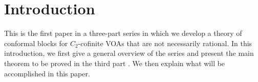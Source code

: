 \documentclass[11pt,b5paper,notitlepage]{article}
\theoremstyle{definition}
\theoremstyle{plain}
\newcommand{\<}{\left\langle}
\renewcommand{\>}{\right\rangle}
\numberwithin{equation}{section}
\begin{document}
\tableofcontents




	
	
	
	

	
	

	
	
	
	
	
	
	
	
	

	




\section{Introduction}


\nocite{HLZ1,HLZ2,HLZ3,HLZ4,HLZ5,HLZ6,HLZ7,HLZ8}
This is the first paper in a three-part series in which we develop a theory of conformal blocks for $C_2$-cofinite VOAs that are not necessarily rational. In this introduction, we first give a general overview of the series and present the main theorem to be proved in the third part \cite{GZ3}. We then explain what will be accomplished in this paper.
\end{document}
